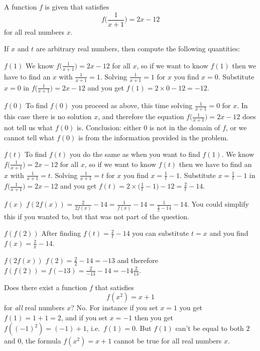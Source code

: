 \begin{multicols}{2}
\endanswer







\problem A function $f$ is given that satisfies 
\[
  f\bigl(\frac1{x+1}\bigr) = 2x-12
\]
for all real numbers $x$.

If $x$ and $t$ are arbitrary real numbers, then
compute the following quantities:

\subprob $f(1)$
\answer 
We know $f\bigl(\frac1{x+1}\bigr) = 2x-12$ for all $x$, so if we want to know
$f(1)$ then we have to find an $x$ with $\frac{1}{x+1} = 1$.  Solving $\frac{1}{x+1} = 1$
for $x$ you find $x=0$. Substitute $x=0$ in $f\bigl(\frac1{x+1}\bigr) = 2x-12$
and you get $f(1) = 2\times0-12 = -12$.
\endanswer


\subprob $f(0)$
\answer 
To find $f(0)$ you proceed as above, this time solving $\frac{1}{x+1} = 0$ for
$x$.  In this case there is no solution $x$, and therefore the equation
$f\bigl(\frac1{x+1}\bigr) = 2x-12$ does not tell us what $f(0)$ is.  Conclusion:
either 0 is not in the domain of $f$, or we cannot tell what $f(0)$ is from
the  information provided in the problem.
\endanswer



\subprob $f(t)$
\answer 
To find $f(t)$ you do the same as when you want to find $f(1)$.
We know $f\bigl(\frac1{x+1}\bigr) = 2x-12$ for all $x$, so if we want to know
$f(t)$ then we have to find an $x$ with $\frac{1}{x+1} = t$.  Solving $\frac{1}{x+1} = t$
for $x$ you find $x=\frac 1t -1$. Substitute $x=\frac 1t -1$ in $f\bigl(\frac1{x+1}\bigr) = 2x-12$
and you get $f(t) = 2\times\bigl(\frac{1}{t}-1\bigr)-12 = \frac{2}{t} -14 $.
\endanswer


\subprob $f(x)$
\answer 
$f(2f(x)) = \frac{2}{2f(x)} - 14 = \frac{1}{f(x)} - 14 =
\frac{1}{\frac{2}{x}-14} - 14$.  You could simplify this if you wanted to, but
that was not part of the question.
\endanswer



\subprob $f(f(2))$
\answer 
After finding $f(t) = \frac{2}{t} -14 $ you can substitute $t=x$ and you find
$f(x) = \frac{2}{x} -14 $.
\endanswer



\subprob $f(2f(x))$
\answer 
$f(2) = \frac{2}{2}-14 = -13 $ and therefore $f(f(2)) = f(-13) = \frac{2}{-13}-14 = -14\frac2{13} $.
\endanswer




\problem Does there exist a function $f$ that satisfies 
\[
  f(x^2) = x+1
\]
for \emph{all} real numbers $x$?
\answer 
No.  For instance if you set $x=1$ you get $f(1) = 1+1=2$, and if you set
$x=-1$ then you get $f((-1)^2) = (-1)+1$, i.e.\ $f(1) = 0$.  But $f(1)$
can't be equal to both $2$ and $0$, the formula $f(x^2) = x+1$ cannot be
true for all real numbers $x$.
\endanswer





\end{multicols}
